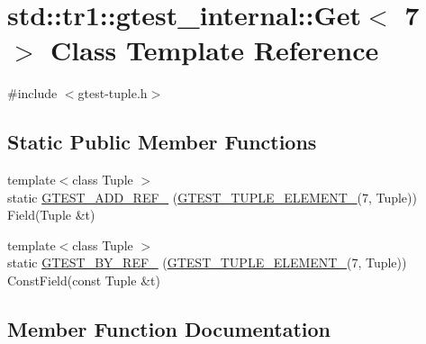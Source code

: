 \hypertarget{classstd_1_1tr1_1_1gtest__internal_1_1_get_3_017_01_4}{}\section{std\+:\+:tr1\+:\+:gtest\+\_\+internal\+:\+:Get$<$ 7 $>$ Class Template Reference}
\label{classstd_1_1tr1_1_1gtest__internal_1_1_get_3_017_01_4}


{\ttfamily \#include $<$gtest-\/tuple.\+h$>$}

\subsection*{Static Public Member Functions}
\begin{DoxyCompactItemize}
\item 
{\footnotesize template$<$class Tuple $>$ }\\static \hyperlink{classstd_1_1tr1_1_1gtest__internal_1_1_get_3_017_01_4_ae1245f00b2ad610a130681b5bc81051c}{G\+T\+E\+S\+T\+\_\+\+A\+D\+D\+\_\+\+R\+E\+F\+\_\+} (\hyperlink{gtest-tuple_8h_a1b7f133d8aa02e0b7afed7b66781eeb7}{G\+T\+E\+S\+T\+\_\+\+T\+U\+P\+L\+E\+\_\+\+E\+L\+E\+M\+E\+N\+T\+\_\+}(7, Tuple)) Field(Tuple \&t)
\item 
{\footnotesize template$<$class Tuple $>$ }\\static \hyperlink{classstd_1_1tr1_1_1gtest__internal_1_1_get_3_017_01_4_afb7bd56e0697304325cd157d11df4a7b}{G\+T\+E\+S\+T\+\_\+\+B\+Y\+\_\+\+R\+E\+F\+\_\+} (\hyperlink{gtest-tuple_8h_a1b7f133d8aa02e0b7afed7b66781eeb7}{G\+T\+E\+S\+T\+\_\+\+T\+U\+P\+L\+E\+\_\+\+E\+L\+E\+M\+E\+N\+T\+\_\+}(7, Tuple)) Const\+Field(const Tuple \&t)
\end{DoxyCompactItemize}


\subsection{Member Function Documentation}
\hypertarget{classstd_1_1tr1_1_1gtest__internal_1_1_get_3_017_01_4_ae1245f00b2ad610a130681b5bc81051c}{}
